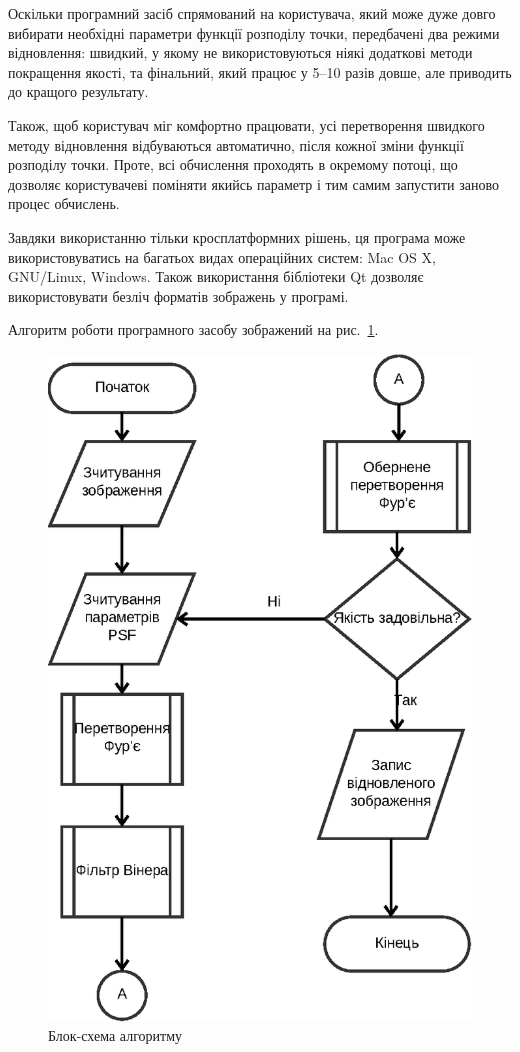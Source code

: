\documentclass{diploma}
\begin{document}
  Оскільки програмний засіб спрямований на користувача, який може дуже довго
  вибирати необхідні параметри функції розподілу точки, передбачені два режими
  відновлення: швидкий, у якому не використовуються ніякі додаткові методи
  покращення якості, та фінальний, який працює у 5--10 разів довше, але
  приводить до кращого результату.

  Також, щоб користувач міг комфортно працювати, усі перетворення швидкого
  методу відновлення відбуваються автоматично, після кожної зміни функції
  розподілу точки.
  Проте, всі обчислення проходять в окремому потоці, що дозволяє
  користувачеві поміняти якийсь параметр і тим самим запустити заново процес
  обчислень.

  Завдяки використанню тільки кросплатформних рішень, ця програма може
  використовуватись на багатьох видах операційних систем: Mac OS X, GNU/Linux,
  Windows.
  Також використання бібліотеки Qt дозволяє використовувати безліч форматів
  зображень у програмі.

  Алгоритм роботи програмного засобу зображений на рис.~\ref{fig:flowchart}.
  \begin{figure}[ht]
    \centering
    \includegraphics{flowchart.eps}
    \caption{Блок-схема алгоритму}
    \label{fig:flowchart}
  \end{figure}
\end{document}
